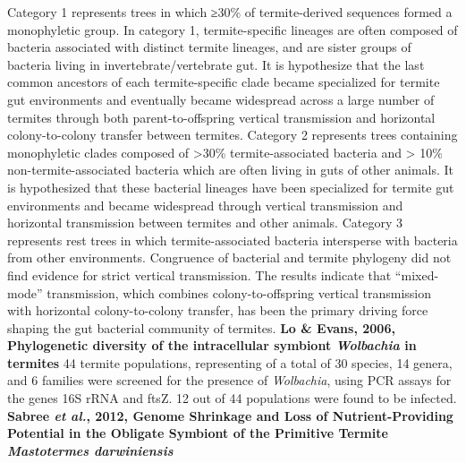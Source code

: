 \documentclass[11pt]{article}
\begin{document}
\begin{sloppypar}
Category 1 represents trees in which ≥30\% of termite-derived sequences formed a monophyletic group. 
In category 1, termite-specific lineages are often composed of bacteria associated with distinct termite lineages, and are sister groups of bacteria living in invertebrate/vertebrate gut. 
It is hypothesize that the last common ancestors of each termite-specific clade became specialized for termite gut environments and eventually became widespread across a large number of termites through both parent-to-offspring vertical transmission and horizontal colony-to-colony transfer between termites. 
Category 2 represents trees containing monophyletic clades composed of >30\% termite-associated bacteria and > 10\% non-termite-associated bacteria which are often living in guts of other animals. 
It is hypothesized that these bacterial lineages have been specialized for termite gut environments and became widespread through vertical transmission and horizontal transmission between termites and other animals. 
Category 3 represents rest trees in which termite-associated bacteria intersperse with bacteria from other environments. 
Congruence of bacterial and termite phylogeny did not find evidence for strict vertical transmission. 
The results indicate that “mixed-mode” transmission, which combines colony-to-offspring vertical transmission with horizontal colony-to-colony transfer, has been the primary driving force shaping the gut bacterial community of termites.
\textbf{Lo & Evans, 2006, Phylogenetic diversity of the intracellular symbiont \textit{Wolbachia} in termites}
44  termite populations, representing of a total of 30 species, 14 genera, and 6 families were screened for the presence of \textit{Wolbachia}, using PCR assays for the genes 16S rRNA and ftsZ. 
12 out of 44 populations were found to be infected. 
\textbf{Sabree \textit{et al.}, 2012, Genome Shrinkage and Loss of Nutrient-Providing Potential in the Obligate Symbiont of the Primitive Termite \textit{Mastotermes darwiniensis}}

\end{sloppypar}
\end{document}
